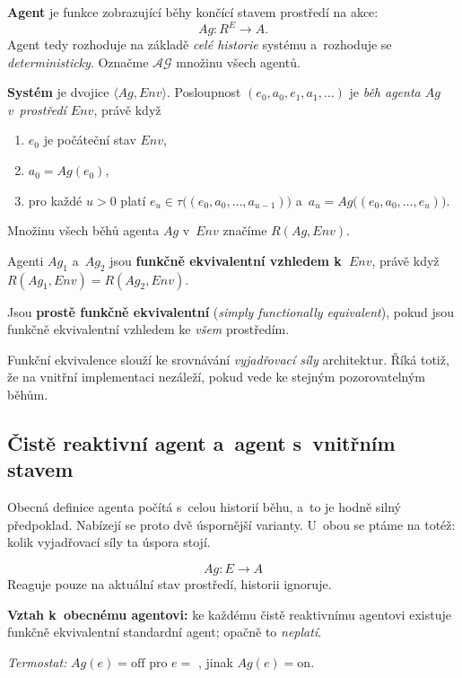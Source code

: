\documentclass[11pt,a4paper]{article}
\theoremstyle{definition}
\begin{document}
\begin{defbox}
\textbf{Agent} je funkce zobrazující běhy končící stavem prostředí na akce:
\[
Ag : R^E \to A .
\]
Agent tedy rozhoduje na základě \emph{celé historie} systému a~rozhoduje se \emph{deterministicky}.
Označme $\mathcal{AG}$ množinu všech agentů.

\textbf{Systém} je dvojice $\langle Ag, \mathit{Env}\rangle$. Posloupnost
$(e_0, a_0, e_1, a_1, \dots)$ je \emph{běh agenta $Ag$ v~prostředí $\mathit{Env}$}, právě když
\begin{enumerate}
\item $e_0$ je počáteční stav $\mathit{Env}$,
\item $a_0 = Ag(e_0)$,
\item pro každé $u > 0$ platí $e_u \in \tau\big((e_0,a_0,\dots,a_{u-1})\big)$
  a~$a_u = Ag\big((e_0,a_0,\dots,e_u)\big)$.
\end{enumerate}
Množinu všech běhů agenta $Ag$ v~$\mathit{Env}$ značíme $R(Ag,\mathit{Env})$.
\end{defbox}

\begin{defbox}
Agenti $Ag_1$ a~$Ag_2$ jsou \textbf{funkčně ekvivalentní vzhledem k~$\mathit{Env}$}, právě když
$R(Ag_1,\mathit{Env}) = R(Ag_2,\mathit{Env})$.

Jsou \textbf{prostě funkčně ekvivalentní} (\emph{simply functionally equivalent}), pokud jsou
funkčně ekvivalentní vzhledem ke \emph{všem} prostředím.
\end{defbox}

Funkční ekvivalence slouží ke srovnávání \emph{vyjadřovací síly} architektur. Říká totiž, že na
vnitřní implementaci nezáleží, pokud vede ke stejným pozorovatelným běhům.

\subsection{Čistě reaktivní agent a~agent s~vnitřním stavem}

Obecná definice agenta počítá s~celou historií běhu, a~to je hodně silný předpoklad. Nabízejí se
proto dvě úspornější varianty. U~obou se ptáme na totéž: kolik vyjadřovací síly ta úspora stojí.

\begin{defbox}
\[
Ag : E \to A
\]
Reaguje pouze na aktuální stav prostředí, historii ignoruje.

\textbf{Vztah k~obecnému agentovi:} ke každému čistě reaktivnímu agentovi existuje funkčně
ekvivalentní standardní agent; opačně to \emph{neplatí}.

\emph{Termostat:} $Ag(e) = \mathrm{off}$ pro $e = $ , jinak $Ag(e) = \mathrm{on}$.
\end{defbox}
\end{document}

